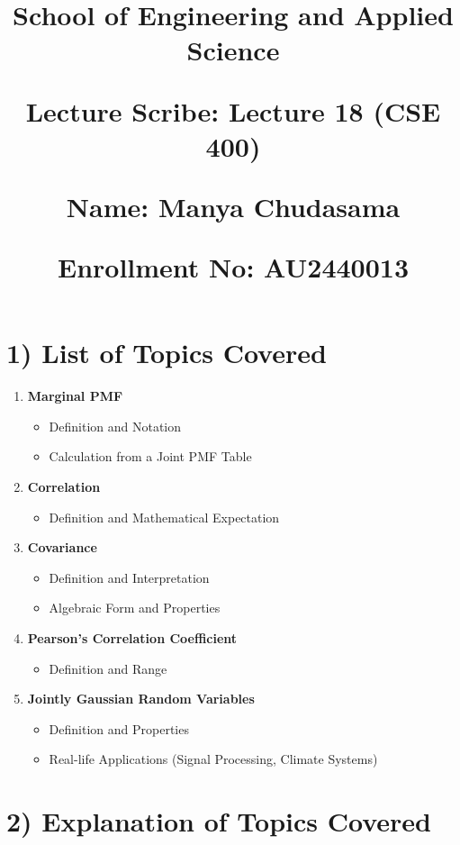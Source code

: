 \documentclass[11pt]{article}
\title{

    \Large \textbf{School of Engineering and Applied Science} \\

    \vspace{0.5cm}

    \large \textbf{Lecture Scribe}: Lecture 18 (CSE 400) \\

    \vspace{0.2cm}

    \normalsize \textbf{Name:} Manya Chudasama\\

    \vspace{0.2cm}

    \normalsize \textbf{Enrollment No:} AU2440013

}
\date{}
\begin{document}
\maketitle
\section*{1) List of Topics Covered}
\begin{enumerate}
    \item \textbf{Marginal PMF}
    \begin{itemize}
        \item Definition and Notation
        \item Calculation from a Joint PMF Table
    \end{itemize}
    \item \textbf{Correlation}
    \begin{itemize}
        \item Definition and Mathematical Expectation
    \end{itemize}
    \item \textbf{Covariance}
    \begin{itemize}
        \item Definition and Interpretation
        \item Algebraic Form and Properties
    \end{itemize}
    \item \textbf{Pearson’s Correlation Coefficient}
    \begin{itemize}
        \item Definition and Range
    \end{itemize}
    \item \textbf{Jointly Gaussian Random Variables}
    \begin{itemize}
        \item Definition and Properties
        \item Real-life Applications (Signal Processing, Climate Systems)
    \end{itemize}
\end{enumerate}

\vspace{0.3cm}

\section*{2) Explanation of Topics Covered}
\end{document}
